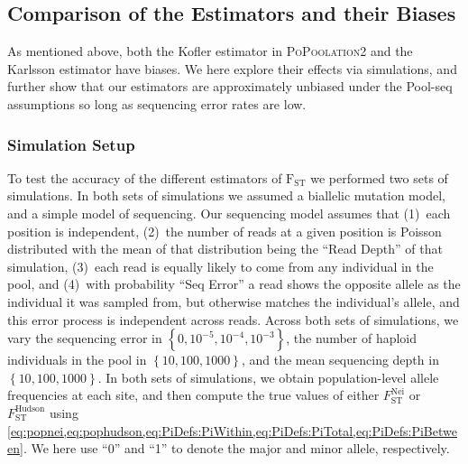 \documentclass[letterpaper,fontsize=9pt,DIV=12]{scrartcl}
\newcommand\toolname{\textsc}
\newcommand{\neifst}{F_\text{ST}^\text{Nei}}
\newcommand{\hudsonfst}{F_\text{ST}^\text{Hudson}}
\begin{document}
\subsection{Comparison of the Estimators and their Biases}
\label{supp:sec:FST:sub:Comparison}

As mentioned above, both the Kofler estimator in \toolname{PoPoolation2} and the Karlsson estimator have biases.
We here explore their effects via simulations, and further show that our estimators are approximately unbiased under the Pool-seq assumptions so long as sequencing error rates are low.


\subsubsection*{Simulation Setup}
\label{supp:sec:FST:sub:Comparison:sub:Simulations}

To test the accuracy of the different estimators of $\text{F}_\text{ST}$ we performed two sets of simulations.  In both sets of simulations we assumed a biallelic mutation model, and a simple model of sequencing.  Our sequencing model assumes that (1)~each position is independent, (2)~the number of reads at a given position is Poisson distributed with the mean of that distribution being the ``Read Depth'' of that simulation, (3)~each read is equally likely to come from any individual in the pool, and (4)~with probability ``Seq Error'' a read shows the opposite allele as the individual it was sampled from, but otherwise matches the individual's allele, and this error process is independent across reads.  Across both sets of simulations, we vary the sequencing error in $\left\{0, 10^{-5}, 10^{-4}, 10^{-3}\right\}$, the number of haploid individuals in the pool in $\left\{10, 100, 1000\right\}$, and the mean sequencing depth in $\left\{10, 100, 1000\right\}$.  In both sets of simulations, we obtain population-level allele frequencies at each site, and then compute the true values of either $\neifst$ or $\hudsonfst$ using \cref{eq:popnei,eq:pophudson,eq:PiDefs:PiWithin,eq:PiDefs:PiTotal,eq:PiDefs:PiBetween}.
We here use ``0'' and ``1'' to denote the major and minor allele, respectively.
\end{document}
